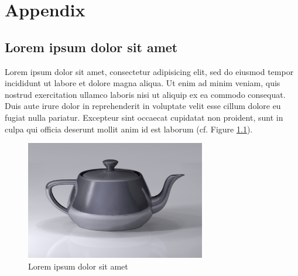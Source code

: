 \appendix

\chapter{Appendix}
\label{chap:appendix}

\section{Lorem ipsum dolor sit amet}\label{appendix:sec:section_name_1}

Lorem ipsum dolor sit amet, consectetur adipisicing elit, sed do eiusmod tempor incididunt ut labore et dolore magna aliqua. Ut enim ad minim veniam, quis nostrud exercitation ullamco laboris nisi ut aliquip ex ea commodo consequat. Duis aute irure dolor in reprehenderit in voluptate velit esse cillum dolore eu fugiat nulla pariatur. Excepteur sint occaecat cupidatat non proident, sunt in culpa qui officia deserunt mollit anim id est laborum (cf. Figure \ref{appendix:fig:utah_teapot}).

\begin{figure}[h]
\centering
\includegraphics[width=0.7\textwidth]{figs/appendix/utah_teapot}
\caption{Lorem ipsum dolor sit amet}
\label{appendix:fig:utah_teapot}
\end{figure}
